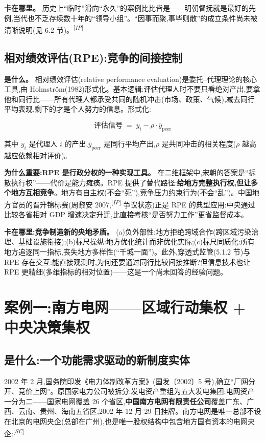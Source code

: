 \documentclass[UTF8,12pt,a4paper]{ctexrep}
\newcommand{\src}[1]{\textsuperscript{[\emph{#1}]}}
\begin{document}
\textbf{卡在哪里。} 历史上``临时''滑向``永久''的案例比比皆是——明朝督抚就是最好的先例,当代也不乏存续数十年的``领导小组''。``因事而聚,事毕则散''的成立条件尚未被清晰说明(见 6.2 节)。\src{IP}

\subsection{相对绩效评估(RPE):竞争的间接控制}

\textbf{是什么。} 相对绩效评估(relative performance evaluation)是委托--代理理论的核心工具,由 Holmstr\"om(1982)形式化。基本逻辑:评估代理人时不要只看绝对产出,要拿他和同行比——所有代理人都承受共同的随机冲击(市场、政策、气候),减去同行平均表现,剩下的才是个人努力的信息。形式化:

\begin{equation}
  \text{评估信号} \;=\; y_i - \rho \cdot \bar{y}_{\text{peer}}
\end{equation}

其中 $y_i$ 是代理人 $i$ 的产出,$\bar{y}_{\text{peer}}$ 是同行平均产出,$\rho$ 是共同冲击的相关程度($\rho$ 越高越应依赖相对评价)。

\textbf{为什么重要:RPE 是行政分权的一种实现工具。} 在二维框架中,宋朝的答案是``拆散执行权''——代价是能力瘫痪。RPE 提供了替代路径:\textbf{给地方完整执行权,但让多个地方互相竞争}。地方有自主权(不会``死''),竞争压力约束行为(不会``乱'')。中国地方官员的晋升锦标赛(周黎安 2007,\src{IP} 争议状态)正是 RPE 的典型应用:中央通过比较各省相对 GDP 增速决定升迁,比直接考核``是否努力工作''更省监督成本。

\textbf{卡在哪里:竞争制造新的央地矛盾。} (a)负外部性:地方拒绝跨域合作(跨区域污染治理、基础设施衔接);(b)标尺操纵:地方优化统计而非优化实际;(c)标尺同质化:所有地方追逐同一指标,丧失地方多样性(``千城一面'')。此外,穿透式监管(5.1.2 节)与 RPE 存在交互:能直接观测时,为何还要通过同行比较间接推断?但信息技术也让 RPE 更精细(多维指标的相对位置)——这是一个尚未回答的经验问题。

\section{案例一:南方电网——区域行动集权 + 中央决策集权}\label{sec:csg}

\subsection{是什么:一个功能需求驱动的新制度实体}

2002 年 2 月,国务院印发《电力体制改革方案》(国发〔2002〕5 号),确立``厂网分开、竞价上网''。原国家电力公司被拆分:发电资产重组为五大发电集团;电网资产一分为二——国家电网覆盖 26 个省区,\textbf{中国南方电网有限责任公司}覆盖广东、广西、云南、贵州、海南五省区,2002 年 12 月 29 日挂牌。南方电网是唯一总部不设在北京的电网央企(总部在广州),也是唯一股权结构中包含地方国有资本的电网央企:\src{SC}
\end{document}
